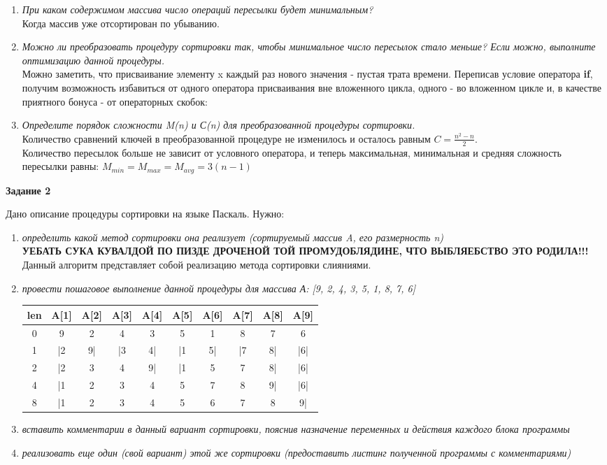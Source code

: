 \documentclass[a4paper,12pt]{report}
\DeclareRobustCommand{\clist}[1]
{
  
}
\DeclareRobustCommand{\task}[1]
{
  {\bf Задание #1}
  \par
}
\DeclareRobustCommand{\unitem}[1]
{
  \item {\it #1} \\
}
\DeclareRobustCommand{\mynote}
{
  {\bf УЕБАТЬ СУКА КУВАЛДОЙ ПО ПИЗДЕ ДРОЧЕНОЙ ТОЙ ПРОМУДОБЛЯДИНЕ, ЧТО
  ВЫБЛЯЕБСТВО ЭТО РОДИЛА!!!}\\
}
\begin{document}
\begin{enumerate}[leftmargin = 10pt]
{\bf Средняя оценка сложности} получится, если предположить, что все элементы
исходного массива - случайные числа. Результат очередной проверки в условном
операторе также является случайным, то есть мы можем считать, что его тело
будет выполняться с вероятностью $\frac{1}{2}$. Тогда: $M_{avg} = 
4(n-1) + \frac{1}{2}\sum\limits_{i=1}^{n-1}n-i = 4(n-1) +
\frac{1}{2}(1 + 2 + 3 + \dots + n-1) = 4(n-1) + \frac{n(n-1)}{4} = 
\frac{n^2 + 15n - 16}{4}$\\
Количество сравнений в данном случае также равно минимальному.
\unitem{При каком содержимом массива число операций пересылки будет
минимальным?}
Когда массив уже отсортирован по убыванию.
\unitem{Можно ли преобразовать процедуру сортировки так, чтобы минимальное число
пересылок стало меньше? Если можно, выполните оптимизацию данной процедуры.}
Можно заметить, что присваивание элементу x каждый раз нового значения -
пустая трата времени. Переписав условие оператора {\bf if}, получим возможность
избавиться от одного оператора присваивания вне вложенного цикла, одного -
во вложенном цикле и, в качестве приятного бонуса - от операторных скобок:
\clist{1-2.pas}
\unitem{Определите порядок сложности M(n) и С(n) для преобразованной процедуры
сортировки.}
Количество сравнений ключей в преобразованной процедуре не изменилось и
осталось равным $C = \frac{n^2 - n}{2}$.\\
Количество пересылок больше не зависит от условного оператора, и теперь
максимальная, минимальная и средняя сложность пересылки равны:
$M_{min} = M_{max} = M_{avg} = 3(n-1)$
\end{enumerate}
\task{2}
Дано описание процедуры сортировки на языке Паскаль. Нужно:
\begin{enumerate}[leftmargin = 10pt]
\unitem{определить какой метод сортировки она реализует (сортируемый массив
A, его размерность n)}
\mynote
Данный алгоритм представляет собой реализацию метода сортировки слияниями.
\unitem{провести пошаговое выполнение данной процедуры для массива А: [9,
2, 4, 3, 5, 1, 8, 7, 6]}

\begin{table}[H]
\begin{tabular}{|c|c|c|c|c|c|c|c|c|c|}
  \hline
    len & 
    A[1] & A[2] & A[3] & A[4] & A[5] & A[6] & A[7] & A[8] & A[9] \\
  \hline
    0 &
    9 & 2 & 4 & 3 & 5 & 1 & 8 & 7 & 6 \\
  \hline
    1 &
    |2 & 9| & |3 & 4| & |1 & 5| & |7 & 8| & |6| \\
  \hline
    2 &
    |2 & 3 & 4 & 9| & |1 & 5 & 7 & 8| & |6| \\
  \hline
    4 &
    |1 & 2 & 3 & 4 & 5 & 7 & 8 & 9| & |6| \\
  \hline
    8 &
    |1 & 2 & 3 & 4 & 5 & 6 & 7 & 8 & 9| \\
  \hline
\end{tabular}
\end{table}
\unitem{вставить комментарии в данный вариант сортировки, пояснив
назначение переменных и действия каждого блока программы}
\clist{2-1.pas}
\unitem{реализовать еще один (свой вариант) этой же сортировки
(предоставить листинг полученной программы с комментариями)}
\clist{2-2.pas}
\end{enumerate}
\end{document}
